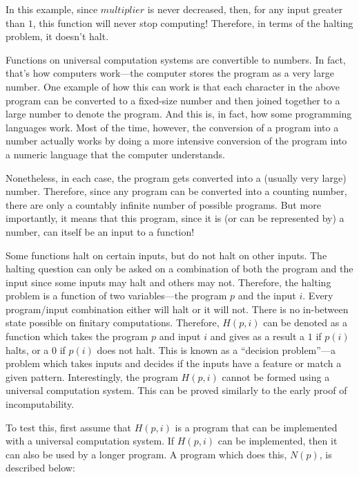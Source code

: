 In this example, since $multiplier$ is never decreased, then, for any input greater than $1$, this function will never stop computing!  Therefore, in terms of the halting problem, it doesn't halt.

Functions on universal computation systems are convertible to numbers.  In fact, that's how computers work---the computer stores the program as a very large number.  One example of how this can work is that each character in the above program can be converted to a fixed-size number and then joined together to a large number to denote the program.  And this is, in fact, how some programming languages work.  Most of the time, however, the conversion of a program into a number actually works by doing a more intensive conversion of the program into a numeric language that the computer understands.  

Nonetheless, in each case, the program gets converted into a (usually very large) number.  Therefore, since any program can be converted into a counting number, there are only a countably infinite number of possible programs.  But more importantly, it means that this program, since it is (or can be represented by) a number, can itself be an input to a function!

Some functions halt on certain inputs, but do not halt on other inputs.  The halting question can only be asked on a combination of both the program and the input since some inputs may halt and others may not.  Therefore, the halting problem is a function of two variables---the program $p$ and the input $i$.  Every program/input combination either will halt or it will not.  There is no in-between state possible on finitary computations.  Therefore, $H(p, i)$ can be denoted as a function which takes the program $p$ and input $i$ and gives as a result a $1$ if $p(i)$ halts, or a $0$ if $p(i)$ does not halt.  This is known as a ``decision problem''---a problem which takes inputs and decides if the inputs have a feature or match a given pattern.  Interestingly, the program $H(p, i)$ cannot be formed using a universal computation system.  This can be proved similarly to the early proof of incomputability.  

To test this, first assume that $H(p, i)$ is a program that can be implemented with a universal computation system.  If $H(p, i)$ can be implemented, then it can also be used by a longer program.  A program which does this, $N(p)$, is described below:

